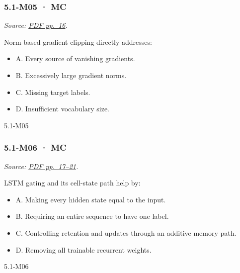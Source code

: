 \noindent\begin{minipage}{\linewidth}

\subsubsection{5.1-M05 · MC}\label{m05-mc-12}

\emph{Source:
\href{../Lecture\%20Slides/5.1.\%20Sequence\%20Models.pdf\#page=16}{PDF
pp.~16}.}

Norm-based gradient clipping directly addresses:

\begin{itemize}
\tightlist
\item
  A. Every source of vanishing gradients.
\item
  B. Excessively large gradient norms.
\item
  C. Missing target labels.
\item
  D. Insufficient vocabulary size.
\end{itemize}

\begin{solution}[8mm]{5.1-M05}

\end{solution}
\end{minipage}\par\medskip

\noindent\begin{minipage}{\linewidth}

\subsubsection{5.1-M06 · MC}\label{m06-mc-12}

\emph{Source:
\href{../Lecture\%20Slides/5.1.\%20Sequence\%20Models.pdf\#page=17}{PDF
pp.~17--21}.}

LSTM gating and its cell-state path help by:

\begin{itemize}
\tightlist
\item
  A. Making every hidden state equal to the input.
\item
  B. Requiring an entire sequence to have one label.
\item
  C. Controlling retention and updates through an additive memory path.
\item
  D. Removing all trainable recurrent weights.
\end{itemize}

\begin{solution}[8mm]{5.1-M06}

\end{solution}
\end{minipage}\par\medskip


